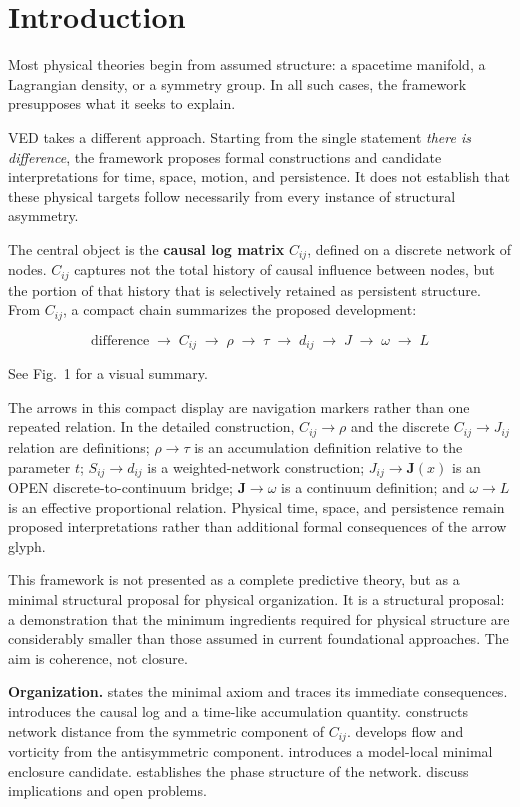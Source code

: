 \section{Introduction}
\label{sec:intro}

Most physical theories begin from assumed structure:
a spacetime manifold, a Lagrangian density, or a symmetry group.
In all such cases, the framework presupposes what it seeks to explain.

VED takes a different approach.
Starting from the single statement \textit{there is difference}, the framework
proposes formal constructions and candidate interpretations for time, space,
motion, and persistence. It does not establish that these physical targets
follow necessarily from every instance of structural asymmetry.

The central object is the \textbf{causal log matrix} $C_{ij}$,
defined on a discrete network of nodes.
$C_{ij}$ captures not the total history of causal influence between nodes,
but the portion of that history that is selectively retained as persistent structure.
From $C_{ij}$, a compact chain summarizes the proposed development:

\begin{keybox}
\begin{equation}
  \text{difference}
  \;\to\; C_{ij}
  \;\to\; \rho
  \;\to\; \tau
  \;\to\; d_{ij}
  \;\to\; J
  \;\to\; \omega
  \;\to\; L
  \label{eq:chain}
\end{equation}
\end{keybox}

\noindent
See Fig.~1 for a visual summary.

The arrows in this compact display are navigation markers rather than one
repeated relation.  In the detailed construction, $C_{ij}\to\rho$ and the
discrete $C_{ij}\to J_{ij}$ relation are definitions; $\rho\to\tau$ is an
accumulation definition relative to the parameter $t$; $S_{ij}\to d_{ij}$ is
a weighted-network construction; $J_{ij}\to\mathbf J(x)$ is an OPEN
discrete-to-continuum bridge; $\mathbf J\to\omega$ is a continuum definition;
and $\omega\to L$ is an effective proportional relation.  Physical time,
space, and persistence remain proposed interpretations rather than additional
formal consequences of the arrow glyph.

This framework is not presented as a complete predictive theory, but as a
minimal structural proposal for physical organization.
It is a structural proposal: a demonstration that the minimum ingredients
required for physical structure are considerably smaller than those
assumed in current foundational approaches.
The aim is coherence, not closure.

\bigskip

\noindent\textbf{Organization.}
 states the minimal axiom and traces its immediate consequences.
 introduces the causal log and a time-like accumulation quantity.
 constructs network distance from the symmetric component of $C_{ij}$.
 develops flow and vorticity from the antisymmetric component.
 introduces a model-local minimal enclosure candidate.
 establishes the phase structure of the network.
 discuss implications and open problems.
